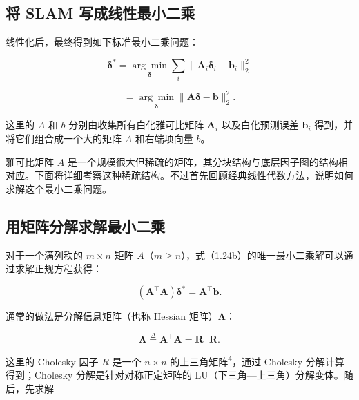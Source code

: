 \subsection{将 SLAM 写成线性最小二乘}

线性化后，最终得到如下标准最小二乘问题：

\begin{equation}
\boldsymbol {\delta} ^ {*} = \underset {\boldsymbol {\delta}} {\arg \min} \sum_ {i} \| \boldsymbol {A} _ {i} \boldsymbol {\delta} _ {i} - \boldsymbol {b} _ {i} \| _ {2} ^ {2}\tag{1.24a}
\end{equation}

\begin{equation}
= \underset {\boldsymbol {\delta}} {\arg \min} \| \boldsymbol {A} \boldsymbol {\delta} - \boldsymbol {b} \| _ {2} ^ {2}.\tag{1.24b}
\end{equation}

这里的 $A$ 和 $b$ 分别由收集所有白化雅可比矩阵 $\pmb A_i$ 以及白化预测误差 $\pmb b_i$ 得到，并将它们组合成一个大的矩阵 $A$ 和右端项向量 $b$。

雅可比矩阵 $A$ 是一个规模很大但稀疏的矩阵，其分块结构与底层因子图的结构相对应。下面将详细考察这种稀疏结构。不过首先回顾经典线性代数方法，说明如何求解这个最小二乘问题。

\subsection{用矩阵分解求解最小二乘}

对于一个满列秩的 $m\times n$ 矩阵 $A$（$m\ge n$），式（1.24b）的唯一最小二乘解可以通过求解正规方程获得：

\begin{equation}
\left(\boldsymbol {A} ^ {\top} \boldsymbol {A}\right) \boldsymbol {\delta} ^ {*} = \boldsymbol {A} ^ {\top} \boldsymbol {b}.\tag{1.25}
\end{equation}

通常的做法是分解信息矩阵（也称 Hessian 矩阵）$\pmb\Lambda$：

\begin{equation}
\boldsymbol {\Lambda} \stackrel {\Delta} {=} \boldsymbol {A} ^ {\top} \boldsymbol {A} = \boldsymbol {R} ^ {\top} \boldsymbol {R}.\tag{1.26}
\end{equation}

这里的 Cholesky 因子 $R$ 是一个 $n\times n$ 的上三角矩阵\textsuperscript{4}，通过 Cholesky 分解计算得到；Cholesky 分解是针对对称正定矩阵的 LU（下三角—上三角）分解变体。随后，先求解

